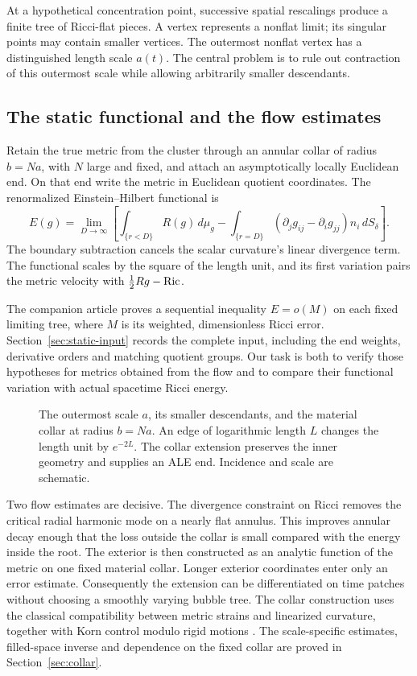 At a hypothetical concentration point, successive spatial rescalings
produce a finite tree of Ricci-flat pieces. A vertex represents a
nonflat limit; its singular points may contain smaller vertices. The
outermost nonflat vertex has a distinguished length scale \(a(t)\).
The central problem is to rule out contraction of this outermost scale
while allowing arbitrarily smaller descendants.

\subsection{The static functional and the flow estimates}

Retain the true metric from the cluster through an annular collar of
radius \(b=Na\), with \(N\) large and fixed, and attach an
asymptotically locally Euclidean end. On that end write the metric in
Euclidean quotient coordinates. The renormalized Einstein--Hilbert
functional is
\[
 E(g)=\lim_{D\to\infty}\left[
 \int_{\{r<D\}}R(g)\,d\mu_g-
 \int_{\{r=D\}}(\partial_jg_{ij}-\partial_ig_{jj})n_i\,dS_\delta
 \right].
\]
The boundary subtraction cancels the scalar curvature's linear
divergence term. The functional scales by the square of the length
unit, and its first variation pairs the metric velocity with
\(\tfrac12 Rg-\operatorname{Ric}\).

The companion article \cite{StaticTrees} proves a sequential inequality
\(E=o(M)\) on each fixed limiting tree, where \(M\) is its weighted,
dimensionless Ricci error. Section~\ref{sec:static-input} records the
complete input, including the end weights, derivative orders and
matching quotient groups. Our task is both to verify those hypotheses
for metrics obtained from the flow and to compare their functional
variation with actual spacetime Ricci energy.

\begin{figure}[htbp]
 \centering
 
 \caption{The outermost scale \(a\), its smaller descendants, and the
 material collar at radius \(b=Na\). An edge of logarithmic length
 \(L\) changes the length unit by \(e^{-2L}\). The collar extension
 preserves the inner geometry and supplies an ALE end. Incidence and
 scale are schematic.}
 \label{fig:scales}
\end{figure}

Two flow estimates are decisive. The divergence constraint on Ricci
removes the critical radial harmonic mode on a nearly flat annulus.
This improves annular decay enough that the loss outside the collar
is small compared with the energy inside the root. The exterior is
then constructed as an analytic function of the metric on one fixed
material collar. Longer exterior coordinates enter only an error
estimate. Consequently the extension can be differentiated on time
patches without choosing a smoothly varying bubble tree.
The collar construction uses the classical compatibility between
metric strains and linearized curvature, together with Korn control
modulo rigid motions \cite{Khavkine2017,CiarletCiarlet2005}.
The scale-specific estimates, filled-space inverse and dependence
on the fixed collar are proved in Section~\ref{sec:collar}.

